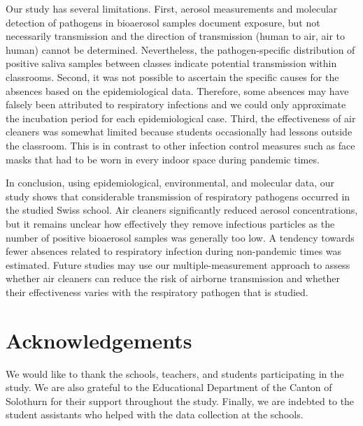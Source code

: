 \documentclass[fleqn,11pt]{wlscirep}
\begin{document}

Our study has several limitations. First, aerosol measurements and molecular detection of pathogens in bioaerosol samples document exposure, but not necessarily transmission and the direction of transmission (human to air, air to human) cannot be determined. Nevertheless, the pathogen-specific distribution of positive saliva samples between classes indicate potential transmission within classrooms. Second, it was not possible to ascertain the specific causes for the absences based on the epidemiological data. Therefore, some absences may have falsely been attributed to respiratory infections and we could only approximate the incubation period for each epidemiological case. Third, the effectiveness of air cleaners was somewhat limited because students occasionally had lessons outside the classroom. This is in contrast to other infection control measures such as face masks that had to be worn in every indoor space during pandemic times.


In conclusion, using epidemiological, environmental, and molecular data, our study shows that considerable transmission of respiratory pathogens occurred in the studied Swiss school. Air cleaners significantly reduced aerosol concentrations, but it remains unclear how effectively they remove infectious particles as the number of positive bioaerosol samples was generally too low. A tendency towards fewer absences related to respiratory infection during non-pandemic times was estimated. Future studies may use our multiple-measurement approach to assess 
whether air cleaners can reduce the risk of airborne transmission and whether their effectiveness varies with the respiratory pathogen that is studied. 


\newpage


\section*{Acknowledgements}
We would like to thank the schools, teachers, and students participating in the study. We are also grateful to the Educational Department of the Canton of Solothurn for their support throughout the study. Finally, we are indebted to the student assistants who helped with the data collection at the schools.


\end{document}
